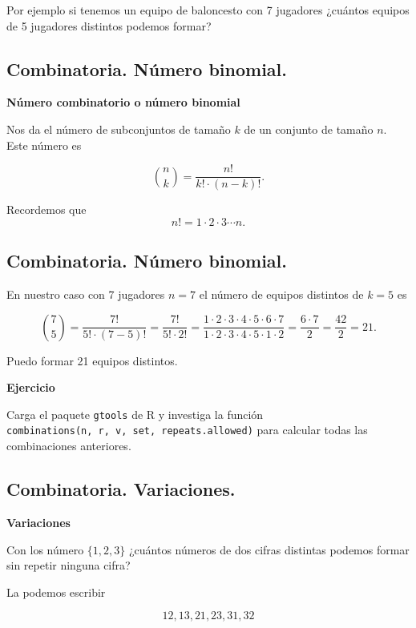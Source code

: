 \documentclass[]{book}
\begin{document}
Por ejemplo si tenemos un equipo de baloncesto con 7 jugadores ¿cuántos equipos de 5 jugadores distintos podemos formar?

\hypertarget{combinatoria.-nuxfamero-binomial.}{%
\subsection{Combinatoria. Número binomial.}\label{combinatoria.-nuxfamero-binomial.}}

\textbf{Número combinatorio o número binomial}

Nos da el número de subconjuntos de tamaño \(k\) de un conjunto de tamaño \(n\). Este número es

\[
{n\choose k} = \frac{n!}{k!\cdot (n-k)!}.
\]

Recordemos que
\[
n!=1\cdot 2\cdot 3\cdots n.
\]

\hypertarget{combinatoria.-nuxfamero-binomial.-1}{%
\subsection{Combinatoria. Número binomial.}\label{combinatoria.-nuxfamero-binomial.-1}}

En nuestro caso con 7 jugadores \(n=7\) el número de equipos distintos de \(k=5\) es

\[
{7\choose 5} = \frac{7!}{5!\cdot (7-5)!}=\frac{7!}{5!\cdot 2!}=
\frac{1\cdot 2\cdot 3 \cdot 4\cdot 5\cdot 6\cdot 7}{1\cdot 2\cdot 3 \cdot 4\cdot 5\cdot 1\cdot 2}=\frac{6\cdot 7}{2}=\frac{42}{2}=21.
\]

Puedo formar 21 equipos distintos.

\textbf{Ejercicio}

Carga el paquete \texttt{gtools} de R y investiga la función \texttt{combinations(n,\ r,\ v,\ set,\ repeats.allowed)} para calcular todas las combinaciones anteriores.

\hypertarget{combinatoria.-variaciones.}{%
\subsection{Combinatoria. Variaciones.}\label{combinatoria.-variaciones.}}

\textbf{Variaciones}

Con los número \(\{1,2,3\}\) ¿cuántos números de dos cifras distintas podemos formar sin repetir ninguna cifra?

La podemos escribir

\[12,13,21,23,31,32\]
\end{document}
